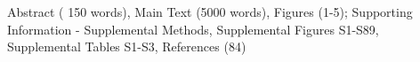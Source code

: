 \documentclass[lineno, sn-basic]{sn-jnl}%
\makeatletter
\def\filecountsname{This file contains}%
\def\filecounts#1{\ifx#1\empty\else\def\@filecounts{\par\addvspace{10pt}{\keywordfont{\bfseries\filecountsname:} #1\par}}\fi}%
\def\@filecounts{}%
\providecommand{\DIFaddbegin}{} %
\providecommand{\DIFaddend}{} %
\providecommand{\DIFdelbegin}{} %
\providecommand{\DIFdelend}{} %
\newcommand{\DIFscaledelfig}{0.5}
\newlength{\DIFdelgraphicswidth} %
\newlength{\DIFdelgraphicsheight} %
\newcommand{\DIFaddincludegraphics}[2][]{{\color{blue}\fbox{\DIFOincludegraphics[#1]{#2}}}} %
\newcommand{\DIFdelincludegraphics}[2][]{%
\sbox{\DIFdelgraphicsbox}{\DIFOincludegraphics[#1]{#2}}%
\settoboxwidth{\DIFdelgraphicswidth}{\DIFdelgraphicsbox} %
\settoboxtotalheight{\DIFdelgraphicsheight}{\DIFdelgraphicsbox} %
\scalebox{\DIFscaledelfig}{%
\parbox[b]{\DIFdelgraphicswidth}{\usebox{\DIFdelgraphicsbox}\\[-\baselineskip] \rule{\DIFdelgraphicswidth}{0em}}\llap{\resizebox{\DIFdelgraphicswidth}{\DIFdelgraphicsheight}{%
\setlength{\unitlength}{\DIFdelgraphicswidth}%
\begin{picture}(1,1)%
\thicklines\linethickness{2pt} %
{\color[rgb]{1,0,0}\put(0,0){\framebox(1,1){}}}%
{\color[rgb]{1,0,0}\put(0,0){\line( 1,1){1}}}%
{\color[rgb]{1,0,0}\put(0,1){\line(1,-1){1}}}%
\end{picture}%
}\hspace*{3pt}}} %
} %
\DeclareRobustCommand{\DIFaddbegin}{\DIFOaddbegin \let\includegraphics\DIFaddincludegraphics} %
\DeclareRobustCommand{\DIFaddend}{\DIFOaddend \let\includegraphics\DIFOincludegraphics} %
\DeclareRobustCommand{\DIFdelbegin}{\DIFOdelbegin \let\includegraphics\DIFdelincludegraphics} %
\DeclareRobustCommand{\DIFdelend}{\DIFOaddend \let\includegraphics\DIFOincludegraphics} %
\makeatother
\begin{document}

		

		\DIFdelbegin %
\DIFdelend \DIFaddbegin \filecounts{Abstract ( 150 words), Main Text (5000 words), Figures (1-5); Supporting Information - Supplemental Methods, Supplemental Figures S1-S89, Supplemental Tables S1-S3, References (84)}
		\DIFaddend 
\end{document}
